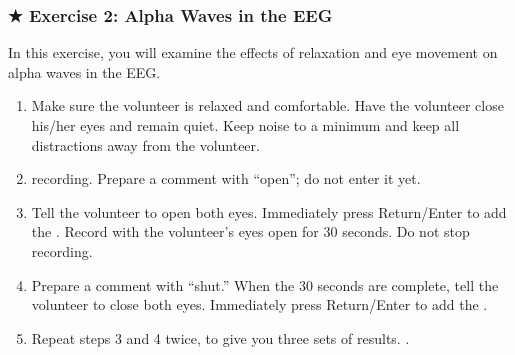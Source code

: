\documentclass[letterpaper,10pt,english]{jupyterBook}
\begin{document}
\subsubsection{★ Exercise 2: Alpha Waves in the EEG}
\label{\detokenize{EEG:exercise-2-alpha-waves-in-the-eeg}}
\sphinxAtStartPar
In this exercise, you will examine the effects of relaxation and eye movement on alpha waves in the EEG.
\begin{enumerate}
%
\item {} 
\sphinxAtStartPar
Make sure the volunteer is relaxed and comfortable. Have the volunteer close his/her eyes and remain quiet. Keep noise to a minimum and keep all distractions away from the volunteer.

\item {} 
\sphinxAtStartPar
{} recording. Prepare a comment with “open”; do not enter it yet.

\item {} 
\sphinxAtStartPar
Tell the volunteer to open both eyes. Immediately press Return/Enter to add the . Record with the volunteer’s eyes open for 30 seconds. Do not stop recording.

\item {} 
\sphinxAtStartPar
Prepare a comment with “shut.” When the 30 seconds are complete, tell the volunteer to close both eyes. Immediately press Return/Enter to add the .

\item {} 
\sphinxAtStartPar
Repeat steps 3 and 4 twice, to give you three sets of results. .

\end{enumerate}

\sphinxAtStartPar
{}
\end{document}
